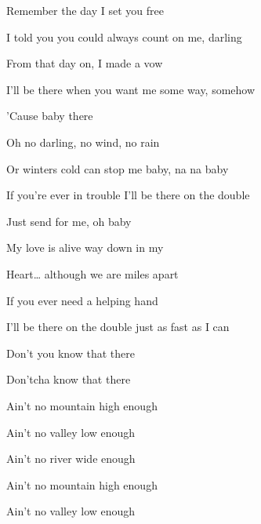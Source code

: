 \begin{song}
\bigskip

Remember the day I set you free \par
I told you you could always count on me, darling \par
From that day on, I made a vow \par
I'll be there when you want me some way, somehow \par
'Cause baby there \par

\bigskip

\Chorus

\bigskip

 Oh no darling, no wind, no rain \par
Or winters cold  can stop me baby, na na baby \par
If you're ever in trouble I'll be there on the double \par
Just send for me, oh baby \par

\bigskip

 My love is alive way down in my \par
{}Heart… although we are miles apart \par
If you ever need a helping hand \par
I'll be there on the double just as fast as I can \par
Don't you know that there \par

\bigskip

\Chorus

\bigskip

Don'tcha know that there \par

\bigskip

 \par
{}Ain't no mountain high enough \par
{}Ain't no valley low enough \par
{}Ain't no river wide enough \par
{}Ain't no mountain high enough \par
{}Ain't no valley low enough \par


\end{song}
